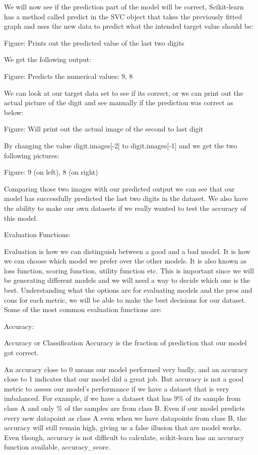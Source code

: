 \documentclass[a4paper,12pt]{report}
\begin{document}
We will now see if the prediction part of the model will be correct, Scikit-learn has a method called predict in the SVC object that takes the previously fitted graph and uses the new data to predict what the intended target value should be:


Figure: Prints out the predicted value of the last two digits

We get the following output: 

Figure: Predicts the numerical values: 9, 8

We can look at our target data set to see if its correct, or we can print out the actual picture of the digit and see manually if the prediction was correct as below:


Figure: Will print out the actual image of the second to last digit

By changing the value digit.images[-2] to digit.images[-1] and we get the two following pictures:

Figure: 9 (on left), 8 (on right)

Comparing those two images with our predicted output we can see that our model has successfully predicted the last two digits in the dataset. We also have the ability to make our own datasets if we really wanted to test the accuracy of this model.

Evaluation Functions:

Evaluation is how we can distinguish between a good and a bad model. It is how we can choose which model we prefer over the other models. It is also known as loss function, scoring function, utility function etc. This is important since we will be generating different models and we will need a way to decide which one is the best. Understanding what the options are for evaluating models and the pros and cons for each metric, we will be able to make the best decisions for our dataset. Some of the most common evaluation functions are:

Accuracy:

Accuracy or Classification Accuracy is the fraction of prediction that our model got correct.

An accuracy close to 0 means our model performed very badly, and an accuracy close to 1 indicates that our model did a great job. But accuracy is not a good metric to assess our model’s performance if we have a dataset that is very imbalanced. For example, if we have a dataset that has 9\% of its sample from class A and only \% of the samples are from class B. Even if our model predicts every new datapoint as class A even when we have datapoints from class B, the accuracy will still remain high, giving us a false illusion that are model works. Even though, accuracy is not difficult to calculate, scikit-learn has an accuracy function available, accuracy\_score.
\end{document}
